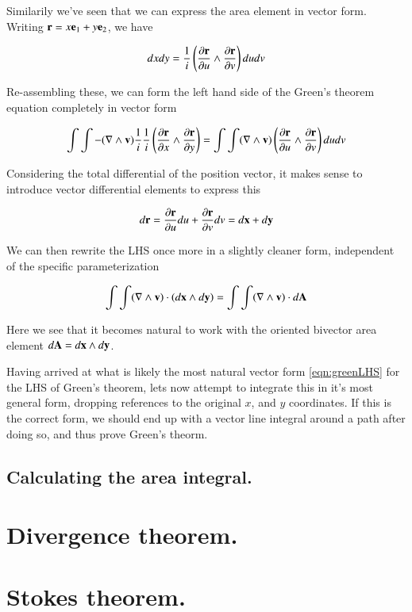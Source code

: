 \documentclass{article}
\newcommand{\grad}[0]{\nabla}
\newcommand{\PD}[2]{\frac{\partial {#2}}{\partial {#1}}}
\begin{document}
Similarily we've seen that we can express the area element in vector form.  Writing $\mathbf{r} = x \mathbf{e}_1 + y \mathbf{e}_2$, we have

\begin{equation*}
dx dy = \inv{i}\left( \PD{u}{\Br} \wedge \PD{v}{\Br} \right) du dv
\end{equation*}

Re-assembling these, we can form the left hand side of the Green's theorem
equation completely in vector form

\begin{equation*}
\int\int -(\grad \wedge \Bv) \inv{i} \inv{i}\left( \PD{x}{\Br} \wedge \PD{y}{\Br} \right)
= \int\int (\grad \wedge \Bv) \left( \PD{u}{\Br} \wedge \PD{v}{\Br} \right) du dv
\end{equation*}

Considering the total differential of the position vector, it makes sense to introduce vector differential elements to
express this

\begin{equation*}
d\Br = \PD{u}{\Br} du + \PD{v}{\Br} dv = d\Bx + d\By
\end{equation*}

We can then rewrite the LHS once more in a slightly cleaner form, independent of the specific parameterization

\begin{equation}\label{eqn:greenLHS}
\int\int (\grad \wedge \Bv) \cdot (d\Bx \wedge d\By) = \int\int (\grad \wedge \Bv) \cdot d\BA
\end{equation}

Here we see that it becomes natural to work with the oriented bivector area element $d\mathbf{A} = d\mathbf{x} \wedge d\mathbf{y}$.

Having arrived at what is likely the most natural vector form \ref{eqn:greenLHS} for the LHS of Green's theorem, lets
now attempt to integrate this in it's most general form, dropping references to the original $x$, and $y$ coordinates.
If this is the correct form, we should end up with a vector line integral around a path after doing so, and thus prove
Green's theorm.

\subsection{ Calculating the area integral. }

\section{ Divergence theorem. }

\section{ Stokes theorem. }
\end{document}
